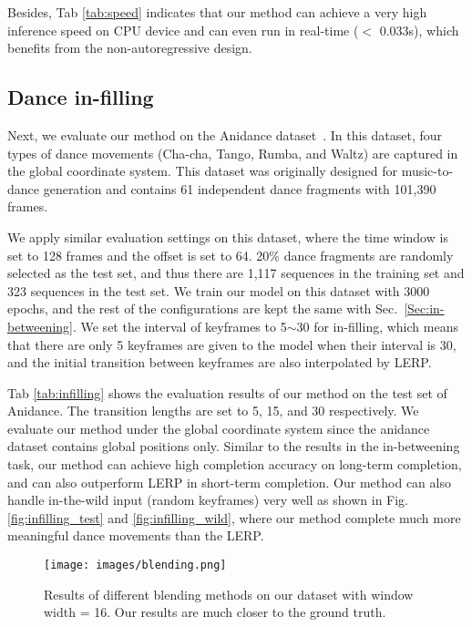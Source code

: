 \documentclass[10pt,twocolumn,letterpaper]{article}
\begin{document}
Besides, Tab \ref{tab:speed} indicates that our method can achieve a very high inference speed on CPU device and can even run in real-time ($<$ 0.033s), which benefits from the non-autoregressive design.


\subsection{Dance in-filling}

Next, we evaluate our method on the Anidance dataset~\cite{tang2018anidance}. In this dataset, four types of dance movements (Cha-cha, Tango, Rumba, and Waltz) are captured in the global coordinate system. This dataset was originally designed for music-to-dance generation and contains 61 independent dance fragments with 101,390 frames.

We apply similar evaluation settings on this dataset, where the time window is set to 128 frames and the offset is set to 64. 20\% dance fragments are randomly selected as the test set, and thus there are 1,117 sequences in the training set and 323 sequences in the test set. We train our model on this dataset with 3000 epochs, and the rest of the configurations are kept the same with Sec.~\ref{Sec:in-betweening}. We set the interval of keyframes to 5$\sim$30 for in-filling, which means that there are only 5 keyframes are given to the model when their interval is 30, and the initial transition between keyframes are also interpolated by LERP. 

Tab \ref{tab:infilling} shows the evaluation results of our method on the test set of Anidance. The transition lengths are set to 5, 15, and 30 respectively. We evaluate our method under the global coordinate system since the anidance dataset contains global positions only. Similar to the results in the in-betweening task, our method can achieve high completion accuracy on long-term completion, and can also outperform LERP in short-term completion. Our method can also handle in-the-wild input (random keyframes) very well as shown in Fig.\ref{fig:infilling_test} and \ref{fig:infilling_wild}, where our method complete much more meaningful dance movements than the LERP. 

\begin{figure}
  \centering
  \texttt{[image: images/blending.png]}
  \caption{Results of different blending methods on our dataset with window width = 16. Our results are much closer to the ground truth.}
  \label{fig:blending}
\end{figure}
\end{document}
